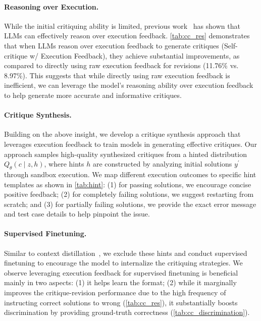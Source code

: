 \paragraph{Reasoning over Execution.}
While the initial critiquing ability is limited, previous work~\cite{ni2024next} has shown that LLMs can effectively reason over execution feedback.
\cref{tab:cc_res} demonstrates that when LLMs reason over execution feedback to generate critiques (Self-critique w/ Execution Feedback), they achieve substantial improvements, as compared to directly using raw execution feedback for revisions (11.76\% vs. 8.97\%).
This suggests that while directly using raw execution feedback is inefficient, we can leverage the model's reasoning ability over execution feedback to help generate more accurate and informative critiques.

\paragraph{Critique Synthesis.} Building on the above insight, we develop a critique synthesis approach that leverages execution feedback to train models in generating effective critiques.
Our approach samples high-quality synthesized critiques from a hinted distribution ${Q_\theta}(c \mid z, h)$, where hints $h$ are constructed by analyzing initial solutions $y^\prime$ through sandbox execution.
We map different execution outcomes to specific hint templates as shown in \cref{tab:hint}: (1) for passing solutions, we encourage concise positive feedback; (2) for completely failing solutions, we suggest restarting from scratch; and (3) for partially failing solutions, we provide the exact error message and test case details to help pinpoint the issue.


\paragraph{Supervised Finetuning.}
Similar to context distillation~\cite{snell2022learning,guan2024deliberative}, we exclude these hints and conduct supervised finetuning to encourage the model to internalize the critiquing strategies.
We observe leveraging execution feedback for supervised finetuning is beneficial mainly in two aspects: (1) it helps learn the format; (2) while it marginally improves the critique-revision performance due to the high frequency of instructing correct solutions to wrong (\cref{tab:cc_res}), it substantially boosts discrimination by providing ground-truth correctness (\cref{tab:cc_discrimination}).







